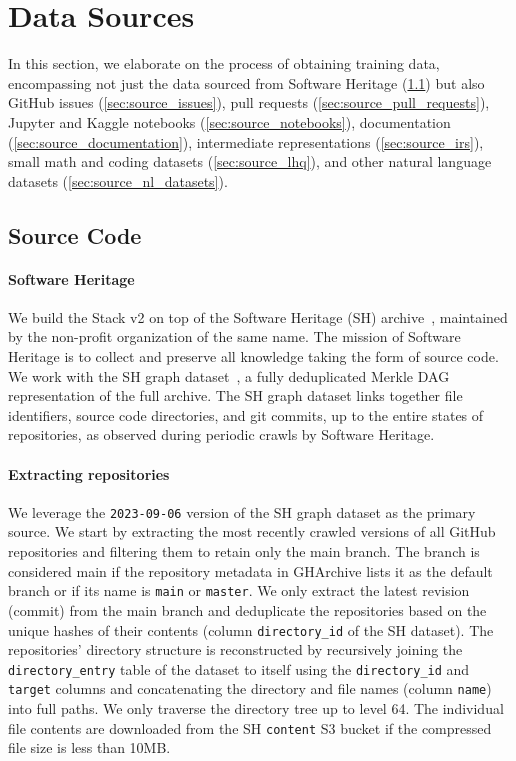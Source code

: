 \documentclass[10pt]{article} %
\begin{document}
\section{Data Sources}\label{sec:data_sources}
In this section, we elaborate on the process of obtaining training data, encompassing not just the data sourced from Software Heritage (\cref{sec:source_code}) but also GitHub issues (\cref{sec:source_issues}), pull requests (\cref{sec:source_pull_requests}), Jupyter and Kaggle notebooks (\cref{sec:source_notebooks}), documentation (\cref{sec:source_documentation}), intermediate representations (\cref{sec:source_irs}), small math and coding datasets (\cref{sec:source_lhq}), and other natural language datasets (\cref{sec:source_nl_datasets}).

\subsection{Source Code} \label{sec:source_code}
\paragraph{Software Heritage} We build the Stack v2 on top of the Software Heritage (SH) archive~\citep{cacm-2018-software-heritage}, maintained by the non-profit organization of the same name. The mission of Software Heritage is to collect and preserve all knowledge taking the form of source code. We work with the SH graph dataset~\citep{msr-2020-challenge}, a fully deduplicated Merkle DAG~\citep{merkle1987digital} representation of the full archive. The SH graph dataset links together file identifiers, source code directories, and git commits, up to the entire states of repositories, as observed during periodic crawls by Software Heritage. 

\paragraph{Extracting repositories} 
We leverage the \verb|2023-09-06| version of the SH graph dataset as the primary source. We start by extracting the most recently crawled versions of all GitHub repositories and filtering them to retain only the main branch. The branch is considered main if the repository metadata in GHArchive lists it as the default branch or if its name is \verb|main| or \verb|master|. We only extract the latest revision (commit) from the main branch and deduplicate the repositories based on the unique hashes of their contents (column \verb|directory_id| of the SH dataset). The repositories' directory structure is reconstructed by recursively joining the \verb|directory_entry| table of the dataset to itself using the \verb|directory_id| and \verb|target| columns and concatenating the directory and file names (column \verb|name|) into full paths. We only traverse the directory tree up to level 64. The individual file contents are downloaded from the SH \verb|content| S3 bucket if the compressed file size is less than 10MB.
\end{document}

